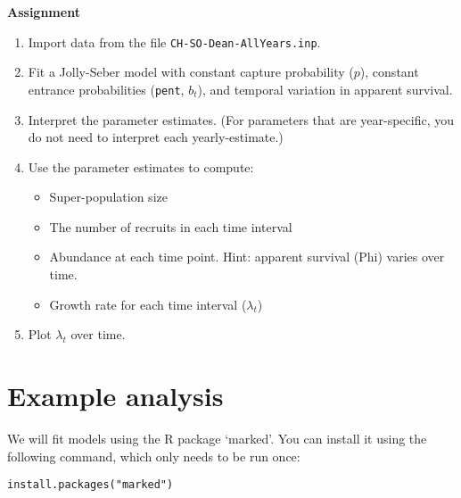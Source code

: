 \documentclass[12pt]{article}\usepackage[]{graphicx}\usepackage[]{color}
\makeatletter
\newcommand{\hlstr}[1]{\textcolor[rgb]{0.749,0.012,0.012}{#1}}%
\newcommand{\hlstd}[1]{\textcolor[rgb]{0,0,0}{#1}}%
\newcommand{\hlkwd}[1]{\textcolor[rgb]{0.004,0.004,0.506}{#1}}%
\newenvironment{kframe}{%
 \def\at@end@of@kframe{}%
 \ifinner\ifhmode%
  \def\at@end@of@kframe{\end{minipage}}%
  \begin{minipage}{\columnwidth}%
 \fi\fi%
 \def\FrameCommand##1{\hskip\@totalleftmargin \hskip-\fboxsep
 \colorbox{shadecolor}{##1}\hskip-\fboxsep
     \hskip-\linewidth \hskip-\@totalleftmargin \hskip\columnwidth}%
 \MakeFramed {\advance\hsize-\width
   \@totalleftmargin\z@ \linewidth\hsize
   \@setminipage}}%
 {\par\unskip\endMakeFramed%
 \at@end@of@kframe}
\newenvironment{knitrout}{}{} %
\makeatother
\begin{document}

{\bf Assignment}

\begin{enumerate}
  \item Import data from the file \texttt{CH-SO-Dean-AllYears.inp}.
  \item Fit a Jolly-Seber model with constant capture probability
    ($p$), constant entrance probabilities (\texttt{pent}, $b_t$), and
    temporal variation in apparent survival.
  \item Interpret the parameter estimates. (For parameters that are
    year-specific, you do not need to interpret each yearly-estimate.) 
  \item Use the parameter estimates to compute:
    \begin{itemize}
      \item Super-population size
      \item The number of recruits in each time interval
      \item Abundance at each time point. Hint: apparent survival
        (Phi) varies over time.
      \item Growth rate for each time interval ($\lambda_t$)
    \end{itemize}
  \item Plot $\lambda_t$ over time.
\end{enumerate}


\clearpage

\section*{Example analysis}




We will fit models using the R package `marked'. You can install it
using the following command, which only needs to be run once: 

\begin{knitrout}
\color{fgcolor}\begin{kframe}
\begin{alltt}
\hlkwd{install.packages}\hlstd{(}\hlstr{"marked"}\hlstd{)}
\end{alltt}
\end{kframe}
\end{knitrout}
\end{document}
